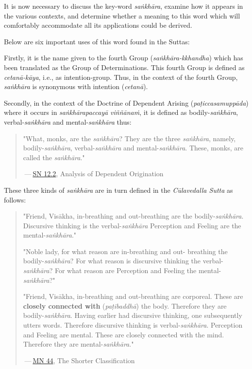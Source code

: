It is now necessary to discuss the key-word \emph{saṅkhāra}, examine how it
appears in the various contexts, and determine whether a meaning to this
word which will comfortably accommodate all its applications could be
derived.


Below are six important uses of this word found in the Suttas:


Firstly, it is the name given to the fourth Group
(\emph{saṅkhāra-kkhandha}) which has been translated as the Group of
Determinations. This fourth Group is defined as \emph{cetanā-kāya}, i.e.,
as intention-group. Thus, in the context of the fourth Group, \emph{saṅkhāra}
is synonymous with intention (\emph{cetanā}).


Secondly, in the context of the Doctrine of Dependent Arising
(\emph{paṭiccasamuppāda}) where it occurs in \emph{saṅkhārapaccayā viññānaṁ},
it is defined as bodily-\emph{saṅkhāra}, verbal-\emph{saṅkhāra} and
mental-\emph{saṅkhāra} thus:


\begin{quotation}
"What, monks, are the \emph{saṅkhāra}? They are
the three \emph{saṅkhāra}, namely, bodily-\emph{saṅkhāra}, verbal-\emph{saṅkhāra}
and mental-\emph{saṅkhāra}. These, monks, are called the
\emph{saṅkhāra}."


 — \href{https://suttacentral.net/sn12.2/en/bodhi}{SN 12.2}, Analysis of Dependent Origination


\end{quotation}

These three kinds of \emph{saṅkhāra} are in turn defined in the
\emph{Cūlavedalla Sutta}  as follows:


\begin{quotation}
"Friend, Visākha, in-breathing and out-breathing are the
bodily-\emph{saṅkhāra}. Discursive thinking is the verbal-\emph{saṅkhāra}
Perception and Feeling are the mental-\emph{saṅkhāra}."


"Noble lady, for what reason are in-breathing and out- breathing the
bodily-\emph{saṅkhāra}? For what reason is discursive thinking the
verbal-\emph{saṅkhāra}? For what reason are Perception and Feeling the
mental-\emph{saṅkhāra}?"


"Friend, Visākha, in-breathing and out-breathing are corporeal. These
are \textbf{closely connected with} (\emph{paṭibaddhā}) the body. Therefore they are
bodily-\emph{saṅkhāra}. Having earlier had discursive thinking, one
subsequently utters words. Therefore discursive thinking is
verbal-\emph{saṅkhāra}. Perception and Feeling are mental. These are
closely connected with the mind. Therefore they are mental-\emph{saṅkhāra}."


 — \href{https://suttacentral.net/mn44/en/sujato}{MN 44}, The Shorter Classification


\end{quotation}

